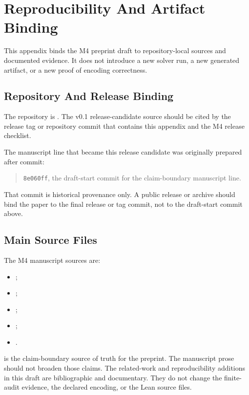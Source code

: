 \section{Reproducibility And Artifact Binding}
\label{sec:reproducibility}

This appendix binds the M4 preprint draft to repository-local sources and
documented evidence. It does not introduce a new solver run, a new generated
artifact, or a new proof of encoding correctness.

\subsection{Repository And Release Binding}

The repository is . The v0.1 release-candidate
source should be cited by the release tag or repository commit that contains
this appendix and the M4 release checklist.

The manuscript line that became this release candidate was originally prepared
after commit:

\begin{quote}
\texttt{8e060ff}, the draft-start commit for the claim-boundary manuscript
line.
\end{quote}

That commit is historical provenance only. A public release or archive should
bind the paper to the final release or tag commit, not to the draft-start
commit above.

\subsection{Main Source Files}

The M4 manuscript sources are:

\begin{itemize}[leftmargin=*]
\item {};
\item {};
\item {};
\item {};
\item {}.
\end{itemize}

 is the claim-boundary source of truth for
the preprint. The manuscript prose should not broaden those claims.
The related-work and reproducibility additions in this draft are bibliographic
and documentary. They do not change the finite-audit evidence, the declared
encoding, or the Lean source files.

